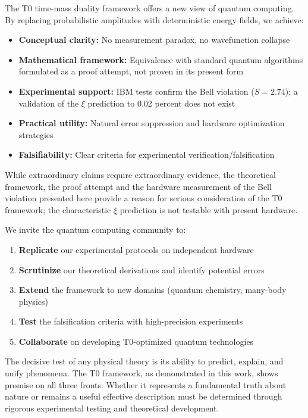 The T0 time-mass duality framework offers a new view of quantum computing. By replacing probabilistic amplitudes with deterministic energy fields, we achieve:

\begin{itemize}
	\item \textbf{Conceptual clarity:} No measurement paradox, no wavefunction collapse
	\item \textbf{Mathematical framework:} Equivalence with standard quantum algorithms formulated as a proof attempt, not proven in its present form
	\item \textbf{Experimental support:} IBM tests confirm the Bell violation ($S = 2.74$); a validation of the $\xi$ prediction to 0.02 percent does not exist
	\item \textbf{Practical utility:} Natural error suppression and hardware optimization strategies
	\item \textbf{Falsifiability:} Clear criteria for experimental verification/falsification
\end{itemize}

While extraordinary claims require extraordinary evidence, the theoretical framework, the proof attempt and the hardware measurement of the Bell violation presented here provide a reason for serious consideration of the T0 framework; the characteristic $\xi$ prediction is not testable with present hardware.

We invite the quantum computing community to:
\begin{enumerate}
	\item \textbf{Replicate} our experimental protocols on independent hardware
	\item \textbf{Scrutinize} our theoretical derivations and identify potential errors
	\item \textbf{Extend} the framework to new domains (quantum chemistry, many-body physics)
	\item \textbf{Test} the falsification criteria with high-precision experiments
	\item \textbf{Collaborate} on developing T0-optimized quantum technologies
\end{enumerate}

The decisive test of any physical theory is its ability to predict, explain, and unify phenomena. The T0 framework, as demonstrated in this work, shows promise on all three fronts. Whether it represents a fundamental truth about nature or remains a useful effective description must be determined through rigorous experimental testing and theoretical development.

